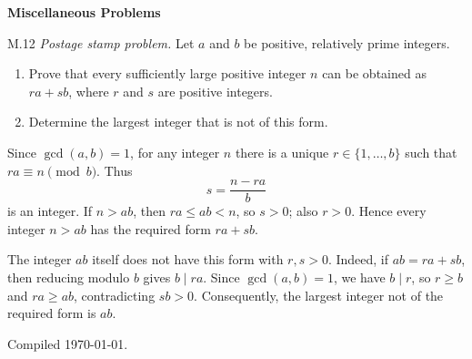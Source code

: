 \documentclass[11pt]{article}
\newcommand{\sectionheading}[1]{%
  \Needspace{8\baselineskip}
  \vspace{0.25em}
  {\color{darkgray}\large\bfseries #1}\par
}
\begin{document}
\sectionheading{Miscellaneous Problems}

\begin{exercise}{M.12}
\textit{Postage stamp problem.} Let $a$ and $b$ be positive, relatively
prime integers.
\begin{enumerate}[label=\textbf{(\alph*)}]
  \item Prove that every sufficiently large positive integer $n$ can be
        obtained as $ra+sb$, where $r$ and $s$ are positive integers.
  \item Determine the largest integer that is not of this form.
\end{enumerate}
\end{exercise}

\begin{solution}
Since $\gcd(a,b)=1$, for any integer $n$ there is a unique
$r\in\{1,\ldots,b\}$ such that $ra\equiv n\pmod b$. Thus
\[
  s=\frac{n-ra}{b}
\]
is an integer. If $n>ab$, then $ra\leq ab<n$, so $s>0$; also $r>0$.
Hence every integer $n>ab$ has the required form $ra+sb$.

The integer $ab$ itself does not have this form with $r,s>0$. Indeed,
if $ab=ra+sb$, then reducing modulo $b$ gives $b\mid ra$. Since
$\gcd(a,b)=1$, we have $b\mid r$, so $r\geq b$ and $ra\geq ab$,
contradicting $sb>0$. Consequently, the largest integer not of the
required form is $\boxed{ab}$.
\end{solution}

\vfill
{\small\color{darkgray}Compiled \today.}
\end{document}
